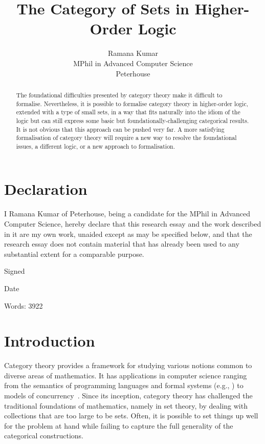 \documentclass[twoside,titlepage,11pt]{article}
\title{The Category of Sets in Higher-Order Logic}
\author{Ramana Kumar\\MPhil in Advanced Computer Science\\Peterhouse}
\begin{document}
\maketitle
\section*{Declaration}%
\thispagestyle{empty}
I Ramana Kumar of Peterhouse, being a candidate for the MPhil in Advanced Computer Science, hereby declare that this research essay and the work described in it are my own work, unaided except as may be specified below, and that the research essay does not contain material that has already been used to any substantial extent for a comparable purpose.

\vspace{1em}
\noindent Signed

\vspace{1em}
\noindent Date

\vspace{2em}
\noindent Words: 3922
\begin{abstract}%
The foundational difficulties presented by category theory make it difficult to formalise.
Nevertheless, it is possible to formalise category theory in higher-order logic, extended with a type of small sets, in a way that fits naturally into the idiom of the logic but can still express some basic but foundationally-challenging categorical results.
It is not obvious that this approach can be pushed very far.
A more satisfying formalisation of category theory will require a new way to resolve the foundational issues, a different logic, or a new approach to formalisation.
\end{abstract}%
\section{Introduction}%
Category theory provides a framework for studying various notions common to diverse areas of mathematics.
It has applications in computer science ranging from the semantics of programming languages and formal systems (e.g., \cite{CroleCT,JacobsCLTT}) to models of concurrency~\cite{DBLP:conf/csl/CattaniW96}.
Since its inception, category theory has challenged the traditional foundations of mathematics, namely in set theory, by dealing with collections that are too large to be sets. 
Often, it is possible to set things up well for the problem at hand while failing to capture the full generality of the categorical constructions.
\end{document}
